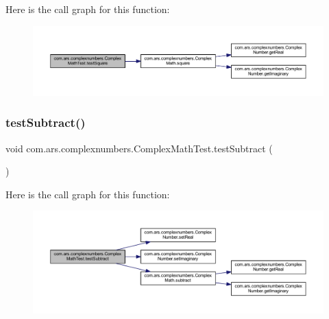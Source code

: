 Here is the call graph for this function\+:\nopagebreak
\begin{figure}[H]
\begin{center}
\leavevmode
\includegraphics[width=350pt]{classcom_1_1ars_1_1complexnumbers_1_1_complex_math_test_a43dc686fe2b96e097f3ee8095fef12c1_cgraph}
\end{center}
\end{figure}
\hypertarget{classcom_1_1ars_1_1complexnumbers_1_1_complex_math_test_a79e2b206d48588b1e7db17a681a405eb}{}\label{classcom_1_1ars_1_1complexnumbers_1_1_complex_math_test_a79e2b206d48588b1e7db17a681a405eb} 
\subsubsection{\texorpdfstring{test\+Subtract()}{testSubtract()}}
{\footnotesize\ttfamily void com.\+ars.\+complexnumbers.\+Complex\+Math\+Test.\+test\+Subtract (\begin{DoxyParamCaption}{ }\end{DoxyParamCaption})}

Here is the call graph for this function\+:\nopagebreak
\begin{figure}[H]
\begin{center}
\leavevmode
\includegraphics[width=350pt]{classcom_1_1ars_1_1complexnumbers_1_1_complex_math_test_a79e2b206d48588b1e7db17a681a405eb_cgraph}
\end{center}
\end{figure}
\hypertarget{classcom_1_1ars_1_1complexnumbers_1_1_complex_math_test_a535b2562407e9de2c6aea700d5e1a0f8}{}\label{classcom_1_1ars_1_1complexnumbers_1_1_complex_math_test_a535b2562407e9de2c6aea700d5e1a0f8} 
